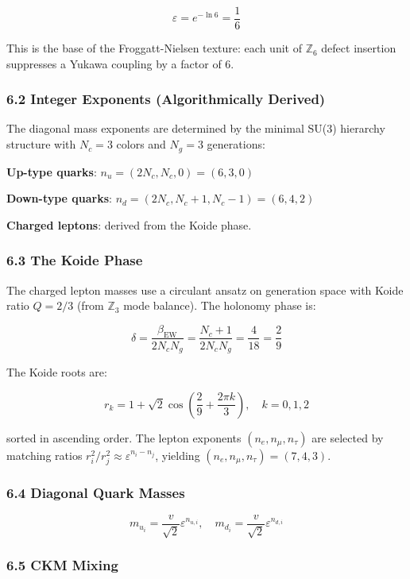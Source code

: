 \[\varepsilon = e^{-\ln 6} = \frac{1}{6}\]

This is the base of the Froggatt-Nielsen texture: each unit of \(\mathbb{Z}_6\) defect insertion suppresses a Yukawa coupling by a factor of 6.

\subsubsection{6.2 Integer Exponents (Algorithmically Derived)}\label{62-integer-exponents-algorithmically-derived}

The diagonal mass exponents are determined by the minimal SU(3) hierarchy structure with \(N_c = 3\) colors and \(N_g = 3\) generations:

\textbf{Up-type quarks}: \(n_u = (2N_c, N_c, 0) = (6, 3, 0)\)

\textbf{Down-type quarks}: \(n_d = (2N_c, N_c+1, N_c-1) = (6, 4, 2)\)

\textbf{Charged leptons}: derived from the Koide phase.

\subsubsection{6.3 The Koide Phase}\label{63-the-koide-phase}

The charged lepton masses use a circulant ansatz on generation space with Koide ratio \(Q = 2/3\) (from \(\mathbb{Z}_3\) mode balance). The holonomy phase is:

\[\delta = \frac{\beta_{\text{EW}}}{2 N_c N_g} = \frac{N_c + 1}{2 N_c N_g} = \frac{4}{18} = \frac{2}{9}\]

The Koide roots are:

\[r_k = 1 + \sqrt{2}\cos\left(\frac{2}{9} + \frac{2\pi k}{3}\right), \quad k = 0, 1, 2\]

sorted in ascending order. The lepton exponents \((n_e, n_\mu, n_\tau)\) are selected by matching ratios \(r_i^2/r_j^2 \approx \varepsilon^{n_i - n_j}\), yielding \((n_e, n_\mu, n_\tau) = (7, 4, 3)\).

\subsubsection{6.4 Diagonal Quark Masses}\label{64-diagonal-quark-masses}

\[m_{u_i} = \frac{v}{\sqrt{2}} \varepsilon^{n_{u,i}}, \quad m_{d_i} = \frac{v}{\sqrt{2}} \varepsilon^{n_{d,i}}\]

\subsubsection{6.5 CKM Mixing}\label{65-ckm-mixing}

